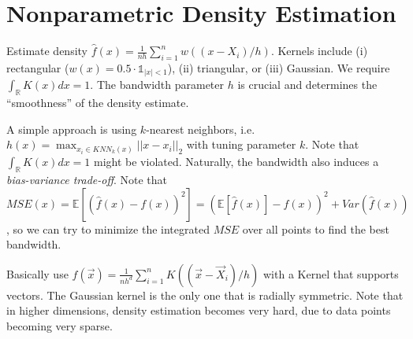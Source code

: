 \section{Nonparametric Density Estimation}\label{sec:nonparametric_density_estimation}
\begin{sectionbox}
  Estimate density $\hat f(x) = \frac{1}{nh}\sum_{i=1}^n w((x-X_i)/h)$.
  Kernels include (i) rectangular ($w(x) = 0.5\cdot\mathds{1}_{|x|<1}$), (ii) triangular, or (iii) Gaussian.
  We require $\int_\mathbb{R}K(x)dx = 1$.
  The bandwidth parameter $h$ is crucial and determines the ``smoothness'' of the density estimate.
\end{sectionbox}
\begin{sectionbox}\nospacing{}
  A simple approach is using $k$-nearest neighbors, i.e. $h(x)=\max_{x_i \in \mathit{KNN}_k(x)} ||x-x_i||_2$ with tuning parameter $k$.
  Note that $\int_\mathbb{R} K(x)dx = 1$ might be violated.
  Naturally, the bandwidth also induces a \emph{bias-variance trade-off}.
  Note that
  \(
  MSE(x) = \mathbb{E}\left[\left(\hat f(x)-f(x)\right)^2\right]=\left(\mathbb{E}[\hat f(x)] - f(x)\right)^2 + Var(\hat f(x))
  \), so we can try to minimize the integrated $MSE$ over all points to find the best bandwidth.

\end{sectionbox}
\begin{sectionbox}\nospacing{}
  Basically use $\hat f(\vec{x}) = \frac{1}{nh^d}\sum_{i=1}^nK((\vec{x}-\vec{X}_i)/h)$ with a Kernel that supports vectors.
  The Gaussian kernel is the only one that is radially symmetric.
  Note that in higher dimensions, density estimation becomes very hard, due to data points becoming very sparse.
\end{sectionbox}
